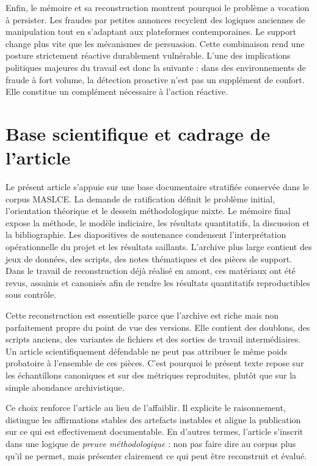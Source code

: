\documentclass[10pt,a4paper]{article}
\begin{document}
Enfin, le mémoire et sa reconstruction montrent pourquoi le problème a vocation à persister. Les fraudes par petites annonces recyclent des logiques anciennes de manipulation tout en s'adaptant aux plateformes contemporaines. Le support change plus vite que les mécanismes de persuasion. Cette combinaison rend une posture strictement réactive durablement vulnérable. L'une des implications politiques majeures du travail est donc la suivante : dans des environnements de fraude à fort volume, la détection proactive n'est pas un supplément de confort. Elle constitue un complément nécessaire à l'action réactive.

\section{Base scientifique et cadrage de l'article}
Le présent article s'appuie sur une base documentaire stratifiée conservée dans le corpus MASLCE. La demande de ratification définit le problème initial, l'orientation théorique et le dessein méthodologique mixte. Le mémoire final expose la méthode, le modèle indiciaire, les résultats quantitatifs, la discussion et la bibliographie. Les diapositives de soutenance condensent l'interprétation opérationnelle du projet et les résultats saillants. L'archive plus large contient des jeux de données, des scripts, des notes thématiques et des pièces de support. Dans le travail de reconstruction déjà réalisé en amont, ces matériaux ont été revus, assainis et canonisés afin de rendre les résultats quantitatifs reproductibles sous contrôle.

Cette reconstruction est essentielle parce que l'archive est riche mais non parfaitement propre du point de vue des versions. Elle contient des doublons, des scripts anciens, des variantes de fichiers et des sorties de travail intermédiaires. Un article scientifiquement défendable ne peut pas attribuer le même poids probatoire à l'ensemble de ces pièces. C'est pourquoi le présent texte repose sur les échantillons canoniques et sur des métriques reproduites, plutôt que sur la simple abondance archivistique.

Ce choix renforce l'article au lieu de l'affaiblir. Il explicite le raisonnement, distingue les affirmations stables des artefacts instables et aligne la publication sur ce qui est effectivement documentable. En d'autres termes, l'article s'inscrit dans une logique de \emph{preuve méthodologique} : non pas faire dire au corpus plus qu'il ne permet, mais présenter clairement ce qui peut être reconstruit et évalué.
\end{document}

